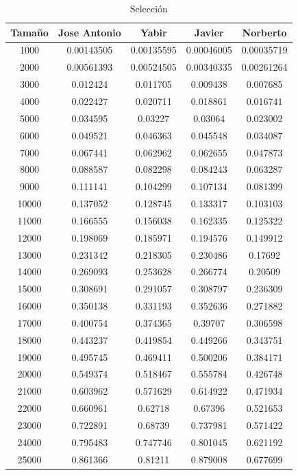 \documentclass[11pt,a4paper]{article}
\begin{document}
\begin{table}[h]
	\centering
	\caption{Selección}
	\begin{tabular}{ | c | c  | c | c | c | }
		\hline
		Tama\~no & Jose Antonio & Yabir & Javier & Norberto\\ 
		\hline
		1000	&	0.00143505	&	0.00135595	&	0.00046005	&	0.00035719	\\
		2000	&	0.00561393	&	0.00524505	&	0.00340335	&	0.00261264	\\
		3000	&	0.012424	&	0.011705	&	0.009438	&	0.007685	\\
		4000	&	0.022427	&	0.020711	&	0.018861	&	0.016741	\\
		5000	&	0.034595	&	0.03227	&	0.03064	&	0.023002	\\
		6000	&	0.049521	&	0.046363	&	0.045548	&	0.034087	\\
		7000	&	0.067441	&	0.062962	&	0.062655	&	0.047873	\\
		8000	&	0.088587	&	0.082298	&	0.084243	&	0.063287	\\
		9000	&	0.111141	&	0.104299	&	0.107134	&	0.081399	\\
		10000	&	0.137052	&	0.128745	&	0.133317	&	0.103103	\\
		11000	&	0.166555	&	0.156038	&	0.162335	&	0.125322	\\
		12000	&	0.198069	&	0.185971	&	0.194576	&	0.149912	\\
		13000	&	0.231342	&	0.218305	&	0.230486	&	0.17692	\\
		14000	&	0.269093	&	0.253628	&	0.266774	&	0.20509	\\
		15000	&	0.308691	&	0.291057	&	0.308797	&	0.236309	\\
		16000	&	0.350138	&	0.331193	&	0.352636	&	0.271882	\\
		17000	&	0.400754	&	0.374365	&	0.39707	&	0.306598	\\
		18000	&	0.443237	&	0.419854	&	0.449266	&	0.343751	\\
		19000	&	0.495745	&	0.469411	&	0.500206	&	0.384171	\\
		20000	&	0.549374	&	0.518467	&	0.555784	&	0.426748	\\
		21000	&	0.603962	&	0.571629	&	0.614922	&	0.471934	\\
		22000	&	0.660961	&	0.62718	&	0.67396	&	0.521653	\\
		23000	&	0.722891	&	0.68739	&	0.737981	&	0.571422	\\
		24000	&	0.795483	&	0.747746	&	0.801045	&	0.621192	\\
		25000	&	0.861366	&	0.81211	&	0.879008	&	0.677699	\\
		\hline
	\end{tabular}
\end{table}
\end{document}
